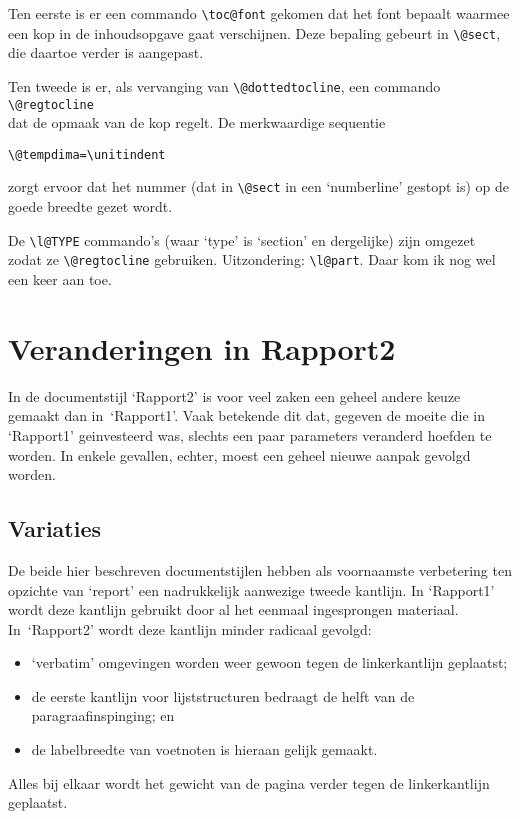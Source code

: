 \documentclass[oldtoc,a4paper,10pt]{rapport3}
\begin{document}
Ten eerste is er een commando \verb+\toc@font+ gekomen dat het font
bepaalt waarmee een kop in de inhoudsopgave gaat verschijnen.  Deze
bepaling gebeurt in \verb+\@sect+, die daartoe verder is aangepast.
 
Ten tweede is er, als vervanging van \verb+\@dottedtocline+, een
commando \verb+\@regtocline+\\ dat de opmaak van de kop regelt.  De
merkwaardige sequentie
\begin{verbatim}
\@tempdima=\unitindent
\end{verbatim}
zorgt ervoor dat het nummer (dat in \verb+\@sect+ in een `numberline'
gestopt is) op de goede breedte gezet wordt.
 
De \verb+\l@TYPE+ commando's (waar `type' is `section' en dergelijke)
zijn omgezet zodat ze \verb+\@regtocline+ gebruiken.  Uitzondering:
\verb+\l@part+. Daar kom ik nog wel een keer aan toe.
 
 
 
\chapter{Veranderingen in Rapport2}
 
In de documentstijl `Rapport2' is voor veel zaken een geheel andere
keuze gemaakt dan in~`Rapport1'. Vaak betekende dit dat, gegeven de
moeite die in `Rapport1' geinvesteerd was, slechts een paar parameters
veranderd hoefden te worden.  In enkele gevallen, echter, moest een
geheel nieuwe aanpak gevolgd worden.
 
\section{Variaties}
 
De beide hier beschreven documentstijlen hebben als voornaamste
verbetering ten opzichte van `report' een nadrukkelijk aanwezige
tweede kantlijn.  In `Rapport1' wordt deze kantlijn gebruikt door al
het eenmaal ingesprongen materiaal.  In~`Rapport2' wordt deze kantlijn
minder radicaal gevolgd:
\begin{itemize}
\item`verbatim' omgevingen worden weer gewoon tegen de linkerkantlijn
  geplaatst;
\item de eerste kantlijn voor lijststructuren bedraagt de helft van de
  paragraafinspinging; en
\item de labelbreedte van voetnoten is hieraan gelijk gemaakt.
\end{itemize}
Alles bij elkaar wordt het gewicht van de pagina verder tegen de
linkerkantlijn geplaatst.
 
\end{document}
